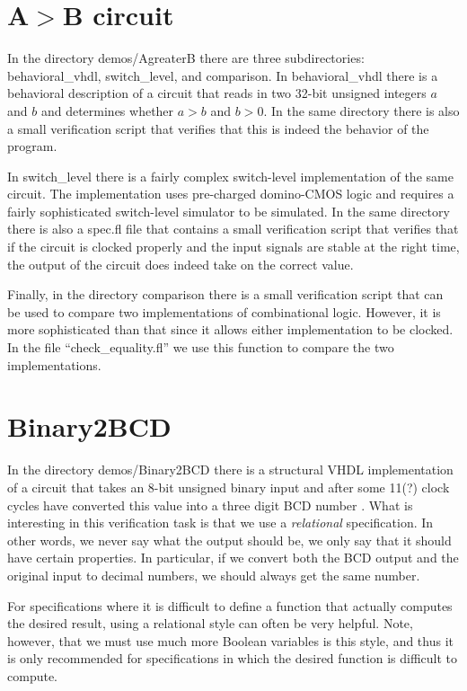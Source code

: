 \section{A\mbox{$>$}B circuit}

In the directory demos/AgreaterB there are three subdirectories:
behavioral\_vhdl, switch\_level, and comparison.
In behavioral\_vhdl there is a behavioral description of
a circuit that reads in two 32-bit unsigned integers $a$ and $b$
and determines whether $a>b$ and $b>0$.
In the same directory there is also a small verification script that
verifies that this is indeed the behavior of the program.

In switch\_level there is a fairly complex switch-level implementation
of the same circuit.
The implementation uses pre-charged domino-CMOS%
%
{}%
%
{} logic and requires
a fairly sophisticated switch-level simulator%
%
{} to be simulated.
In the same directory there is also a spec.fl file that contains
a small verification script that verifies that if the circuit
is clocked properly and the input signals are stable at the right time, 
the output of the circuit does indeed take on the correct value.

Finally, in the directory comparison there is a small verification
script that can be used to compare%
%
{} two implementations of combinational
logic.
However, it is more sophisticated than that since it allows either
implementation to be clocked.
In the file ``check\_equality.fl'' we use this function to
compare the two implementations.

\section{Binary2BCD}

In the directory demos/Binary2BCD there is a structural VHDL
implementation of a circuit that takes an 8-bit unsigned binary input
and after some 11(?) clock cycles have converted this value into
a three digit BCD number%
%
{}.
What is interesting in this verification task is that we use a {\em relational} %
%
specification.
In other words, we never say what the output should be, we only say that
it should have certain properties.
In particular, if we convert both the BCD output and the original input
to decimal numbers, we should always get the same number.

For specifications where it is difficult to define a function that
actually computes the desired result, using a relational style
can often be very helpful.
Note, however, that we must use much more Boolean variables is this
style, and thus it is only recommended for specifications in which
the desired function is difficult to compute.

